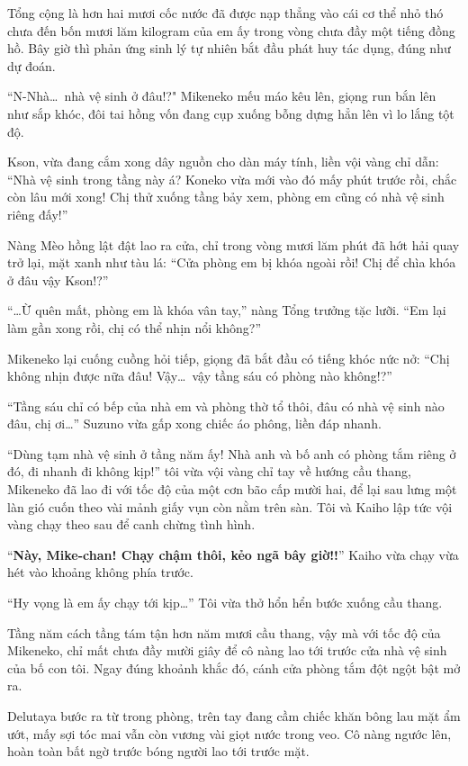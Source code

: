 ﻿\documentclass[../main.tex]{subfiles}
\begin{document}
Tổng cộng là hơn hai mươi cốc nước đã được nạp thẳng vào cái cơ thể nhỏ thó chưa đến bốn mươi lăm kilogram của em ấy trong vòng chưa đầy một tiếng đồng hồ. Bây giờ thì phản ứng sinh lý tự nhiên bắt đầu phát huy tác dụng, đúng như dự đoán.

``N-Nhà\dots\ nhà vệ sinh ở đâu!?" Mikeneko mếu máo kêu lên, giọng run bắn lên như sắp khóc, đôi tai hồng vốn đang cụp xuống bỗng dựng hẳn lên vì lo lắng tột độ.

Kson, vừa đang cắm xong dây nguồn cho dàn máy tính, liền vội vàng chỉ dẫn: ``Nhà vệ sinh trong tầng này á? Koneko vừa mới vào đó mấy phút trước rồi, chắc còn lâu mới xong! Chị thử xuống tầng bảy xem, phòng em cũng có nhà vệ sinh riêng đấy!''

Nàng Mèo hồng lật đật lao ra cửa, chỉ trong vòng mươi lăm phút đã hớt hải quay trở lại, mặt xanh như tàu lá: ``Cửa phòng em bị khóa ngoài rồi! Chị để chìa khóa ở đâu vậy Kson!?''

``\dots Ừ quên mất, phòng em là khóa vân tay,'' nàng Tổng trưởng tặc lưỡi. ``Em lại làm gần xong rồi, chị có thể nhịn nổi không?''

Mikeneko lại cuống cuồng hỏi tiếp, giọng đã bắt đầu có tiếng khóc nức nở: ``Chị không nhịn được nữa đâu! Vậy\dots\ vậy tầng sáu có phòng nào không!?''

``Tầng sáu chỉ có bếp của nhà em và phòng thờ tổ thôi, đâu có nhà vệ sinh nào đâu, chị ơi\dots'' Suzuno vừa gấp xong chiếc áo phông, liền đáp nhanh.

``Dùng tạm nhà vệ sinh ở tầng năm ấy! Nhà anh và bố anh có phòng tắm riêng ở đó, đi nhanh đi không kịp!'' tôi vừa vội vàng chỉ tay về hướng cầu thang, Mikeneko đã lao đi với tốc độ của một cơn bão cấp mười hai, để lại sau lưng một làn gió cuốn theo vài mảnh giấy vụn còn nằm trên sàn. Tôi và Kaiho lập tức vội vàng chạy theo sau để canh chừng tình hình.

``\textbf{Này, Mike-chan! Chạy chậm thôi, kẻo ngã bây giờ!!}'' Kaiho vừa chạy vừa hét vào khoảng không phía trước.

``Hy vọng là em ấy chạy tới kịp\dots'' Tôi vừa thở hổn hển bước xuống cầu thang.

Tầng năm cách tầng tám tận hơn năm mươi cầu thang, vậy mà với tốc độ của Mikeneko, chỉ mất chưa đầy mười giây để cô nàng lao tới trước cửa nhà vệ sinh của bố con tôi. Ngay đúng khoảnh khắc đó, cánh cửa phòng tắm đột ngột bật mở ra.

Delutaya bước ra từ trong phòng, trên tay đang cầm chiếc khăn bông lau mặt ẩm ướt, mấy sợi tóc mai vẫn còn vương vài giọt nước trong veo. Cô nàng ngước lên, hoàn toàn bất ngờ trước bóng người lao tới trước mặt.
\end{document}
